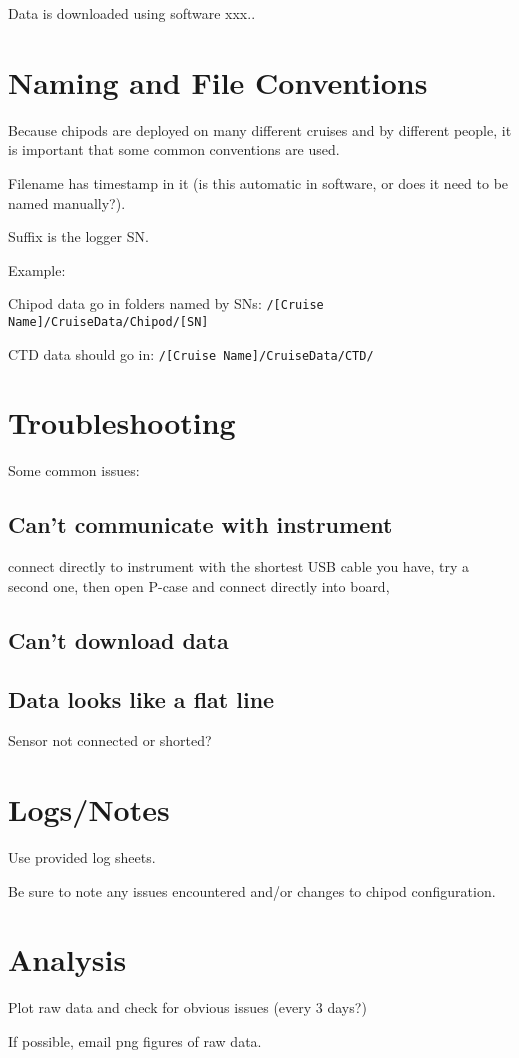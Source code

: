 \documentclass[11pt]{article}
\begin{document}
Data is downloaded using software xxx..


\section{Naming and File Conventions}

Because chipods are deployed on many different cruises and by different people, it is important that some common conventions are used. 

Filename has timestamp in it (is this automatic in software, or does it need to be named manually?).

Suffix is the logger SN.

Example:

Chipod data go in folders named by SNs:
\verb+/[Cruise Name]/CruiseData/Chipod/[SN]+

CTD data should go in:
\verb+/[Cruise Name]/CruiseData/CTD/+

\section{Troubleshooting}

Some common issues:

\subsection{Can't communicate with instrument}
connect directly to instrument with the shortest USB cable you have, try a second one, then open P-case and connect directly into board, 

\subsection{Can't download data}

\subsection{Data looks like a flat line}
Sensor not connected or shorted?


\section{Logs/Notes}

Use provided log sheets.

Be sure to note any issues encountered and/or changes to chipod configuration. 


\section{Analysis}

Plot raw data and check for obvious issues (every 3 days?)

If possible, email png figures of raw data. 
\end{document}
